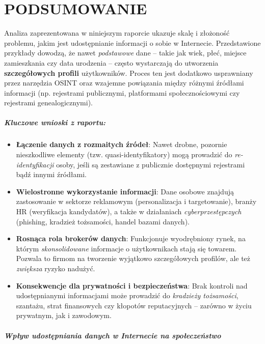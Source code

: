 \chapter{PODSUMOWANIE}

\noindent
Analiza zaprezentowana w niniejszym raporcie ukazuje skalę i złożoność problemu, jakim jest udostępnianie informacji o sobie w Internecie. Przedstawione przykłady dowodzą, że nawet \emph{podstawowe} dane – takie jak wiek, płeć, miejsce zamieszkania czy data urodzenia – często wystarczają do utworzenia \textbf{szczegółowych profili} użytkowników. Proces ten jest dodatkowo usprawniany przez narzędzia OSINT oraz wzajemne powiązania między różnymi źródłami informacji (np. rejestrami publicznymi, platformami społecznościowymi czy rejestrami genealogicznymi). 

\paragraph{Kluczowe wnioski z raportu:}
\begin{itemize}
    \item \textbf{Łączenie danych z rozmaitych źródeł}: Nawet drobne, pozornie nieszkodliwe elementy (tzw. quasi-identyfikatory) mogą prowadzić do \emph{re-identyfikacji} osoby, jeśli są zestawiane z publicznie dostępnymi rejestrami bądź innymi źródłami.
    \item \textbf{Wielostronne wykorzystanie informacji}: Dane osobowe znajdują zastosowanie w sektorze reklamowym (personalizacja i targetowanie), branży HR (weryfikacja kandydatów), a także w działaniach \emph{cyberprzestępczych} (phishing, kradzież tożsamości, handel bazami danych). 
    \item \textbf{Rosnąca rola brokerów danych}: Funkcjonuje wyodrębniony rynek, na którym \emph{skonsolidowane} informacje o użytkownikach stają się towarem. Pozwala to firmom na tworzenie wyjątkowo szczegółowych profilów, ale też \emph{zwiększa} ryzyko nadużyć.
    \item \textbf{Konsekwencje dla prywatności i bezpieczeństwa}: Brak kontroli nad udostępnianymi informacjami może prowadzić do \emph{kradzieży tożsamości}, szantażu, strat finansowych czy kłopotów reputacyjnych – zarówno w życiu prywatnym, jak i zawodowym.
\end{itemize}

\paragraph{Wpływ udostępniania danych w Internecie na społeczeństwo}
